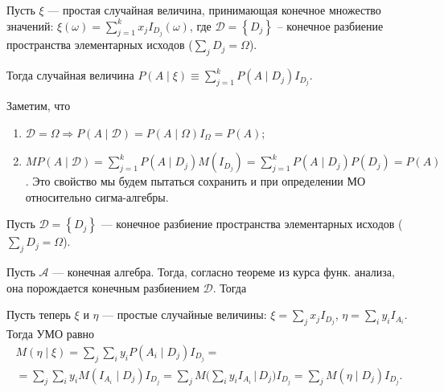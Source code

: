 \begin{definition}
  Пусть $\xi$ --- простая случайная величина, принимающая конечное множество значений:
  $\xi(\omega) = \sum\limits_{j=1}^k x_j I_{D_j}(\omega)$, где
  $\mathscr{D} = \left\{ D_j \right\} $ -- конечное разбиение пространства элементарных
  исходов ($\sum_j D_j = \Omega$).

  Тогда случайная величина $P(A \mid \xi) \equiv \sum\limits_{j=1}^k P(A\mid D_j) I_{D_j}$.
\end{definition}

  Заметим, что
  \begin{enumerate}
    \item $\mathscr{D} = \Omega \Rightarrow P(A \mid \mathscr{D}) = P(A\mid \Omega) I_\Omega = P(A)$;
    \item $MP(A \mid \mathscr{D}) = \sum\limits_{j=1}^k P(A \mid D_j) M(I_{D_j}) =
      \sum\limits_{j=1}^k P(A\mid D_j) P(D_j) = P(A)$. Это свойство мы будем пытаться
      сохранить и
      при определении МО относительно сигма-алгебры.
  \end{enumerate}


\begin{definition}
  Пусть $\mathscr{D} = \left\{ D_j \right\} $ --- конечное разбиение
  пространства элементарных
  исходов ($\sum_j D_j = \Omega$). 
\end{definition}

\begin{definition}
  Пусть $\mathscr{A}$ --- конечная алгебра. Тогда, согласно теореме из курса
  функ. анализа, 
  она порождается конечным разбиением $\mathscr{D}$. Тогда 
\end{definition}

\begin{definition}
  Пусть теперь $\xi$ и $\eta$ --- простые случайные величины:
  $\xi = \sum_j x_j I_{D_j}$, $\eta = \sum_i y_i I_{A_i}$.
  Тогда УМО равно
  \begin{multline*}
    M(\eta \mid \xi) = \sum_j \sum_i y_i P(A_i \mid D_j) I_{D_j} = \\ =
    \sum_j \sum_i y_i M(I_{A_i} \mid D_j) I_{D_j} = 
    \sum_j M \bigg( \sum_i y_i I_{A_i} \, \Big| \, D_j \bigg) I_{D_j}
    = \sum_j M(\eta \mid D_j) I_{D_j}.
  \end{multline*}
\end{definition}

